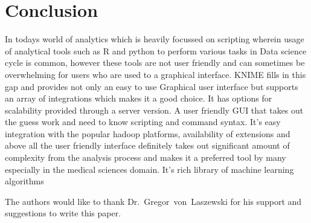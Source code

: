 \section{Conclusion}

In todays world of analytics which is heavily focussed on scripting wherein
usage of analytical tools such as R and python to perform various tasks in Data
science cycle is common, however these tools are not user friendly and can
sometimes be overwhelming for users who are used to a graphical interface. KNIME
fills in this gap and provides not only an easy to use Graphical user interface
but supports an array of integrations which makes it a good choice. It has
options for scalability provided through a server version. A user friendly GUI
that takes out the guess work and need to know scripting and command
syntax. It's easy integration with the popular hadoop platforms, availability of
extensions and above all the user friendly interface definitely takes out
significant amount of complexity from the analysis process and makes it a
preferred tool by many especially in the medical sciences domain. It's rich
library of machine learning algorithms

\begin{acks}

  The authors would like to thank Dr.~Gregor~von~Laszewski for his support and
  suggestions to write this paper.

\end{acks}


 

